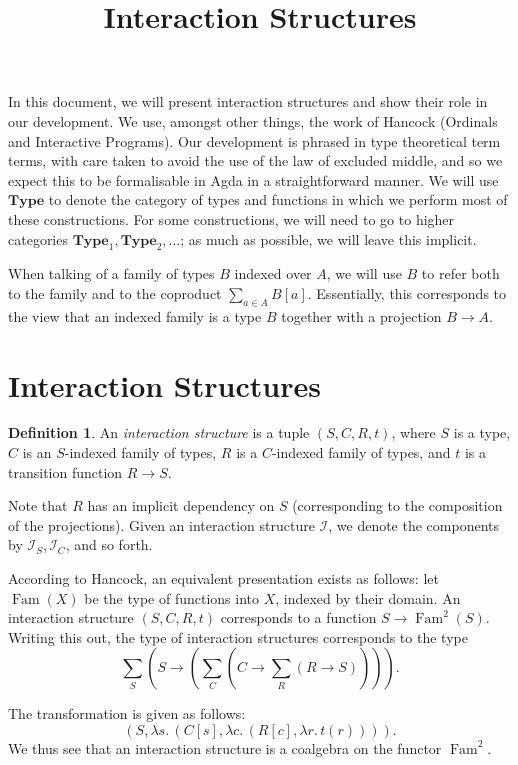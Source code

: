 \documentclass{article}
\title{\vspace{-2cm}Interaction Structures}
\theoremstyle{definition}
\newtheorem{definition}[theorem]{Definition}
\newcommand{\mc}[1]{\mathcal{#1}}
\newcommand{\iss}[1]{\mathcal{#1}_S}
\newcommand{\isc}[1]{\mathcal{#1}_C}
\DeclareMathOperator{\Fam}{Fam}
\begin{document}
    \maketitle

    In this document, we will present interaction structures and show their role in our development.  We use, amongst
    other things, the work of Hancock (Ordinals and Interactive Programs).  Our development is phrased in type
    theoretical term terms, with care taken to avoid the use of the law of excluded middle, and so we expect this to be
    formalisable in Agda in a straightforward manner.  We will use $\mathbf{Type}$ to denote the category of types and
    functions in which we perform most of these constructions.  For some constructions, we will need to go to higher
    categories $\mathbf{Type}_1, \mathbf{Type}_2, \ldots$; as much as possible, we will leave this implicit.

    When talking of a family of types $B$ indexed over $A$, we will use $B$ to refer both to the family and to the
    coproduct $\sum_{a \in A} B[a]$.  Essentially, this corresponds to the view that an indexed family is a type $B$
    together with a projection $B \to A$.

    \section{Interaction Structures}

    \begin{definition}
        An \emph{interaction structure} is a tuple $(S, C, R, t)$, where $S$ is a type, $C$ is an $S$-indexed family of
        types, $R$ is a $C$-indexed family of types, and $t$ is a transition function $R \to S$.
    \end{definition}

    Note that $R$ has an implicit dependency on $S$ (corresponding to the composition of the projections).  Given an
    interaction structure $\mc I$, we denote the components by $\iss I, \isc I$, and so forth.

    According to Hancock, an equivalent presentation exists as follows: let $\Fam(X)$ be the type of functions into $X$,
    indexed by their domain. An interaction structure $(S, C, R, t)$ corresponds to a function $S \to \Fam^2(S)$.
    Writing this out, the type of interaction structures corresponds to the type
    \[
        \sum_S (S \to (\sum_C (C \to \sum_R (R \to S)))).
    \]

    The transformation is given as follows:
    \[
        (S, \lambda s.\, (C[s], \lambda c.\, (R[c], \lambda r.\, t(r)))).
    \]
    We thus see that an interaction structure is a coalgebra on the functor $\Fam^2$.
\end{document}
